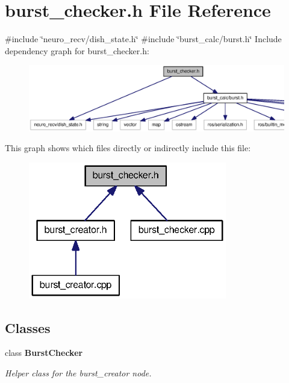 \section{burst\-\_\-checker.\-h \-File \-Reference}
\label{burst__checker_8h}
{\ttfamily \#include \char`\"{}neuro\-\_\-recv/dish\-\_\-state.\-h\char`\"{}}\*
{\ttfamily \#include \char`\"{}burst\-\_\-calc/burst.\-h\char`\"{}}\*
\-Include dependency graph for burst\-\_\-checker.\-h\-:\nopagebreak
\begin{figure}[H]
\begin{center}
\leavevmode
\includegraphics[width=350pt]{burst__checker_8h__incl}
\end{center}
\end{figure}
\-This graph shows which files directly or indirectly include this file\-:\nopagebreak
\begin{figure}[H]
\begin{center}
\leavevmode
\includegraphics[width=245pt]{burst__checker_8h__dep__incl}
\end{center}
\end{figure}
\subsection*{\-Classes}
\begin{DoxyCompactItemize}
\item 
class {\bf \-Burst\-Checker}
\begin{DoxyCompactList}\small\item\em \-Helper class for the burst\-\_\-creator node. \end{DoxyCompactList}\end{DoxyCompactItemize}
